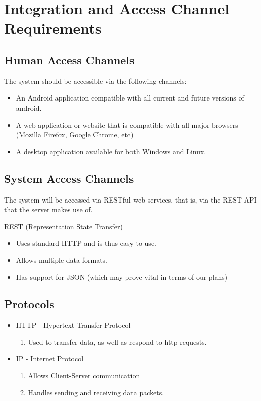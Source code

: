 \section{Integration and Access Channel Requirements}
\subsection{Human Access Channels}
The system should be accessible via the following channels:
\begin{itemize}
    \item An Android application compatible with all current and future versions of android.
    \item A web application or website that is compatible with all major browsers (Mozilla Firefox, Google Chrome, etc)
    \item A desktop application available for both Windows and Linux.
\end{itemize}

\subsection{System Access Channels}
The system will be accessed via RESTful web services, that is, via the REST API that the server makes use of.

REST (Representation State Transfer)
\begin{itemize}
    \item Uses standard HTTP and is thus easy to use.
    \item Allows multiple data formats.
    \item Has support for JSON (which may prove vital in terms of our plans)
\end{itemize}

\subsection{Protocols}
\begin{itemize}
    \item HTTP - Hypertext Transfer Protocol
    \begin{enumerate}
        \item Used to transfer data, as well as respond to http requests.
    \end{enumerate}
    \item IP - Internet Protocol
    \begin{enumerate}
        \item Allows Client-Server communication
        \item Handles sending and receiving data packets.
    \end{enumerate}
\end{itemize}